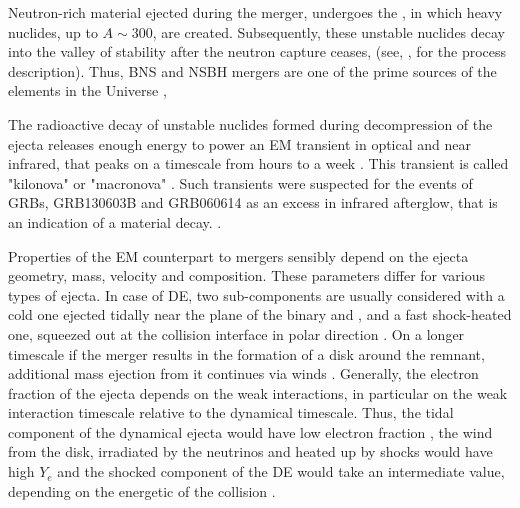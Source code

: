 Neutron-rich material ejected during the merger, undergoes the \rproc{} \nuc{}, in which heavy nuclides, up to $A\sim 300$, are created. Subsequently, these unstable nuclides decay into the valley of stability after the neutron capture ceases, (see, \eg, \citet{Burbidge:1957} for the process description). 
%
Thus, \ac{BNS} and \ac{NSBH} mergers are one of the prime sources of the \rproc{} elements in the Universe \citep{Argast:2003he,Shen:2015,VanDeVoort:2015,Ramirez-Ruiz:2014fsa}, 

The radioactive decay of unstable nuclides formed during decompression of the ejecta releases enough energy to power an \ac{EM} transient in optical and near infrared, that peaks on a timescale from hours to a week \citep{Li:1998bw,Kulkarni:2005jw,Metzger:2010,Kasen:2013xka,Tanaka:2013ana}. 
This transient is called "kilonova" \citep{Metzger:2010} or "macronova" \citep{Kulkarni:2005jw}. 
Such transients were suspected for the events of \acp{GRB}, GRB130603B \citep{Tanvir:2013pia,Berger:2013wna} and GRB060614 \citep{Yang:2015pha,Jin:2015txa} as an excess in infrared afterglow, that is an indication of a \rproc{} material decay. 
. \red{[REFS]} 

Properties of the \ac{EM} counterpart to mergers sensibly depend on the ejecta geometry, mass, velocity and composition. These parameters differ for various types of ejecta. In case of \ac{DE}, two sub-components are usually considered with a cold one ejected tidally near the plane of the binary and \citep{Lattimer:1977,Freiburghaus:1999}, and a fast shock-heated one, squeezed out at the collision interface in polar direction \citep{Bauswein:2013yna,Hotokezaka:2013b}. 
On a longer timescale if the merger results in the formation of a disk around the remnant, additional mass ejection from it continues via winds \citep{Fernandez:2013tya,Perego:2014fma,Just:2014fka}.
Generally, the electron fraction of the ejecta depends on the weak interactions, in particular on the weak interaction timescale relative to the dynamical timescale.
Thus, the tidal component of the dynamical ejecta would have low electron fraction \citep{Korobkin:2012uy}, the wind from the disk, irradiated by the neutrinos and heated up by shocks would have high $Y_e$ \citep{Just:2014fka,Richers:2015lma} and the shocked component of the \ac{DE} would take an intermediate value, depending on the energetic of the collision \citep{Wanajo:2014wha,Goriely:2015fqa}. 

